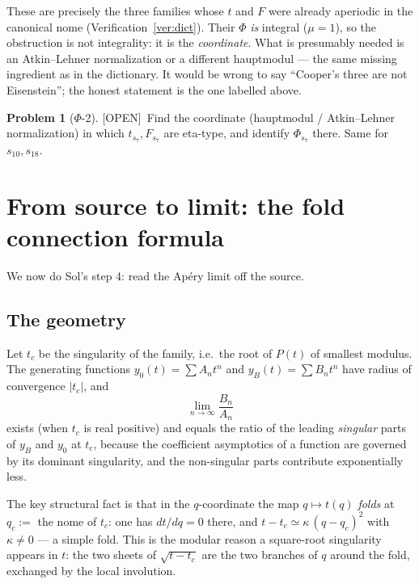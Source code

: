 \documentclass[11pt,reqno]{amsart}
\theoremstyle{plain}
\theoremstyle{definition}
\newtheorem{problem}[theorem]{Problem}
\theoremstyle{remark}
\newcommand{\Open}{\textup{\textsf{[OPEN]}}}
\begin{document}
These are precisely the three families whose $t$ and $F$ were already
aperiodic in the canonical nome (Verification~\ref{ver:dict}). Their $\Phi$
\emph{is} integral ($\mu=1$), so the obstruction is not integrality: it is
the \emph{coordinate}. What is presumably needed is an Atkin--Lehner
normalization or a different hauptmodul --- the same missing ingredient as
in the dictionary. It would be wrong to say ``Cooper's three are not
Eisenstein''; the honest statement is the one labelled above.

\begin{problem}[$\Phi$-2]\label{prob:cooper}
\Open\ Find the coordinate (hauptmodul / Atkin--Lehner normalization) in
which $t_{s_7},F_{s_7}$ are eta-type, and identify $\Phi_{s_7}$ there.
Same for $s_{10},s_{18}$.
\end{problem}

\section{From source to limit: the fold connection formula}
\label{sec:fold}

We now do Sol's step 4: read the Ap\'ery limit off the source.

\subsection{The geometry}
Let $t_c$ be the singularity of the family, i.e.\ the root of $P(t)$ of
smallest modulus. The generating functions $y_0(t)=\sum A_nt^n$ and
$y_B(t)=\sum B_nt^n$ have radius of convergence $|t_c|$, and
\[
\lim_{n\to\infty}\frac{B_n}{A_n}
\]
exists (when $t_c$ is real positive) and equals the ratio of the leading
\emph{singular} parts of $y_B$ and $y_0$ at $t_c$, because the coefficient
asymptotics of a function are governed by its dominant singularity, and the
non-singular parts contribute exponentially less.

The key structural fact is that in the $q$-coordinate the map $q\mapsto
t(q)$ \emph{folds} at $q_c:=$ the nome of $t_c$: one has $dt/dq=0$ there,
and $t-t_c\simeq \kappa\,(q-q_c)^2$ with $\kappa\neq0$ --- a simple fold.
This is the modular reason a square-root singularity appears in $t$: the
two sheets of $\sqrt{t-t_c}$ are the two branches of $q$ around the fold,
exchanged by the local involution.
\end{document}
